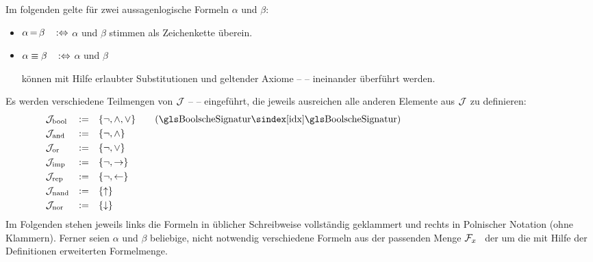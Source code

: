 Im folgenden gelte für zwei aussagenlogische Formeln $\alpha$ und $\beta$:
\begin{itemize}
	\item[] $\alpha \operatorname{=}    \beta \quad \operatorname{:\!\Leftrightarrow}$ \quad $\alpha$ und $\beta$
	stimmen als Zeichenkette überein.
	\item[] $\alpha \equiv \beta \quad \operatorname{:\!\Leftrightarrow}$ \quad $\alpha$ und $\beta$
	\parbox[t]{11cm}{können mit Hilfe erlaubter Substitutionen und geltender Axiome --  -- ineinander überführt werden.}
\end{itemize}
%
Es werden verschiedene Teilmengen von $\mathcal{J}$ --  -- eingeführt, die jeweils ausreichen alle anderen Elemente aus $\mathcal{J}$ zu definieren:
\begin{align}
	& \asJ_\xBool & \defeq & \quad\{ \lnot, \land, \lor \} \label{def:Jbool}
	\qquad (\text{\glsIdx{BoolscheSignatur}})                                \\
	& \asJ_\xAnd  & \defeq & \quad\{ \lnot, \land       \} \label{def:Jand}  \\
	& \asJ_\xOr   & \defeq & \quad\{ \lnot, \lor        \} \label{def:Jor}   \\
	& \asJ_\xImp  & \defeq & \quad\{ \lnot, \limp       \} \label{def:Jimp}  \\
	& \asJ_\xRep  & \defeq & \quad\{ \lnot, \lrep       \} \label{def:Jrep}  \\
	& \asJ_\xNand & \defeq & \quad\{ \lnand             \} \label{def:Jnand} \\
	& \asJ_\xNor  & \defeq & \quad\{ \lnor              \} \label{def:Jnor}
	\formulatoleft\formulatoleft\formulatoleft
\end{align}
%
Im Folgenden stehen jeweils links die Formeln in üblicher Schreibweise vollständig geklammert und rechts in Polnischer Notation (ohne Klammern).
Ferner seien $\alpha$ und $\beta$ beliebige, nicht notwendig verschiedene Formeln aus der passenden Menge $\mathcal{F}_x$ \textbzgl\ der um die mit Hilfe der Definitionen erweiterten Formelmenge.

